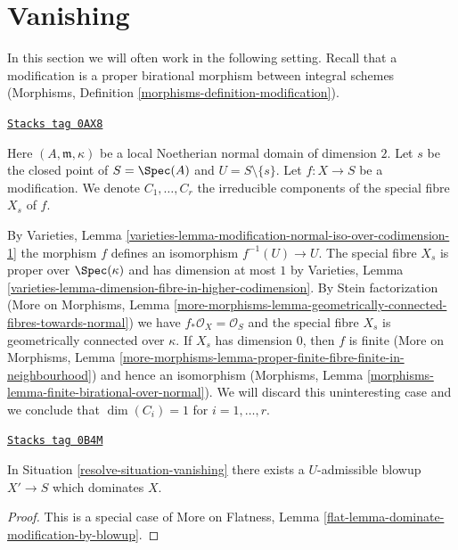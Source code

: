 \section{Vanishing}
\label{resolve-section-vanishing}
In this section we will often work in the following setting.
Recall that a modification is a proper birational morphism
between integral schemes (Morphisms, Definition
\ref{morphisms-definition-modification}).

\begin{definition}
\label{resolve-situation-vanishing}
\href{https://stacks.math.columbia.edu/tag/0AX8}{\texttt{Stacks tag 0AX8}}

Here $(A, \mathfrak m, \kappa)$ be a local Noetherian normal domain of
dimension $2$. Let $s$ be the closed point of $S = \Spec(A)$ and
$U = S \setminus \{s\}$. Let $f : X \to S$ be a modification.
We denote $C_1, \ldots, C_r$ the irreducible
components of the special fibre $X_s$ of $f$.
\end{definition}

By Varieties, Lemma
\ref{varieties-lemma-modification-normal-iso-over-codimension-1}
the morphism $f$ defines an isomorphism $f^{-1}(U) \to U$.
The special fibre $X_s$ is proper over $\Spec(\kappa)$ and
has dimension at most $1$ by Varieties, Lemma
\ref{varieties-lemma-dimension-fibre-in-higher-codimension}.
By Stein factorization (More on Morphisms, Lemma
\ref{more-morphisms-lemma-geometrically-connected-fibres-towards-normal})
we have $f_*\mathcal{O}_X = \mathcal{O}_S$ and
the special fibre $X_s$ is geometrically connected over $\kappa$.
If $X_s$ has dimension $0$, then $f$ is finite
(More on Morphisms, Lemma
\ref{more-morphisms-lemma-proper-finite-fibre-finite-in-neighbourhood})
and hence an isomorphism
(Morphisms, Lemma \ref{morphisms-lemma-finite-birational-over-normal}).
We will discard this uninteresting case and we conclude that
$\dim(C_i) = 1$ for $i = 1, \ldots, r$.

\begin{lemma}
\label{resolve-lemma-dominate-by-scheme-modification}
\href{https://stacks.math.columbia.edu/tag/0B4M}{\texttt{Stacks tag 0B4M}}

In Situation \ref{resolve-situation-vanishing} there exists a $U$-admissible
blowup $X' \to S$ which dominates $X$.
\end{lemma}

\begin{proof}
This is a special case of
More on Flatness, Lemma \ref{flat-lemma-dominate-modification-by-blowup}.
\end{proof}

